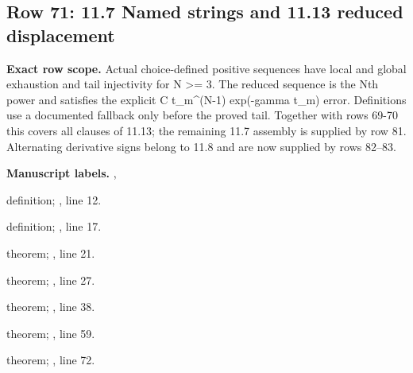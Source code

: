 \subsection{Row 71: 11.7 Named strings and 11.13 reduced displacement}
\label{row:71}
\textbf{Exact row scope.} Actual choice-defined positive sequences have local and global exhaustion and tail injectivity for N >= 3. The reduced sequence is the Nth power and satisfies the explicit C t\_m\textasciicircum{}(N-1) exp(-gamma t\_m) error. Definitions use a documented fallback only before the proved tail. Together with rows 69-70 this covers all clauses of 11.13; the remaining 11.7 assembly is supplied by row 81. Alternating derivative signs belong to 11.8 and are now supplied by rows 82--83.\par\smallskip
\textbf{Manuscript labels.} , \par\smallskip
{\small{}\par}
{\footnotesize\color{muted}definition; , line 12.\par}\smallskip
{\small{}\par}
{\footnotesize\color{muted}definition; , line 17.\par}\smallskip
{\small{}\par}
{\footnotesize\color{muted}theorem; , line 21.\par}\smallskip
{\small{}\par}
{\footnotesize\color{muted}theorem; , line 27.\par}\smallskip
{\small{}\par}
{\footnotesize\color{muted}theorem; , line 38.\par}\smallskip
{\small{}\par}
{\footnotesize\color{muted}theorem; , line 59.\par}\smallskip
{\small{}\par}
{\footnotesize\color{muted}theorem; , line 72.\par}\smallskip
